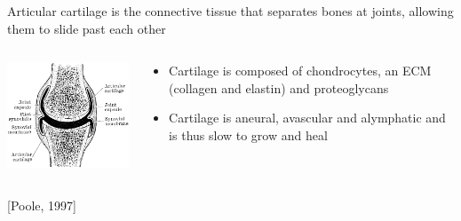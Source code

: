\documentclass[ignorenonframetext]{beamer}
\newcommand{\references}[1] {
  \begin{flushright}
    \scriptsize [#1] \normalsize
  \end{flushright}
}
\begin{document}
\begin{frame}
\begin{columns}
\begin{column}{5cm}
    \end{column}
  \end{columns}
\end{frame}


\begin{frame}{Articular cartilage is the connective tissue that
    separates bones at joints, allowing them to slide past each other}

  \begin{columns}

    \begin{column}{6cm}
      \includegraphics[width=6cm]{../images/pdf/joint}
    \end{column}

    \begin{column}{6cm}
      \begin{itemize}
      \item<1-> Cartilage is composed of chondrocytes, an ECM (collagen
        and elastin) and proteoglycans\\[0.5cm]
        \pause
      \item<2-> Cartilage is aneural, avascular and alymphatic and is thus
        slow to grow and heal %
      \end{itemize}
    \end{column}

  \end{columns}

  \references{Poole, 1997}

\end{frame}
\end{document}

